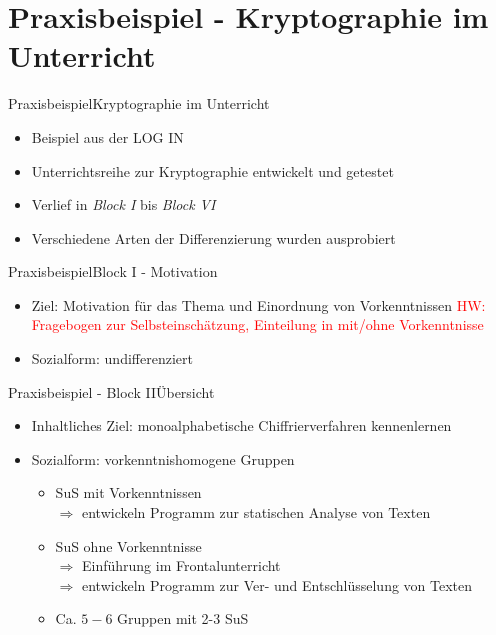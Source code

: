 \documentclass{beamer}
\newcommand{\teacher}[1]{\textcolor{red}{#1}}
\newcommand{\ppause}{}
\begin{document}
	\section{Praxisbeispiel - Kryptographie im Unterricht}
	
	\begin{frame}[t]{Praxisbeispiel}{Kryptographie im Unterricht}
		\begin{itemize}
			\ppause
			\item Beispiel aus der LOG IN
			\ppause
			\item Unterrichtsreihe zur Kryptographie entwickelt und getestet
			\ppause
			\item Verlief in \textit{Block I} bis \textit{Block VI}
			\ppause
			\item Verschiedene Arten der Differenzierung wurden ausprobiert
		\end{itemize}
	\end{frame}
	
	\begin{frame}[t]{Praxisbeispiel}{Block I - Motivation}
		\begin{itemize}
			\ppause
			\item Ziel: Motivation für das Thema und Einordnung von Vorkenntnissen
			\teacher{HW: Fragebogen zur Selbsteinschätzung, Einteilung in mit/ohne Vorkenntnisse}
			\ppause
			\item Sozialform: undifferenziert
		\end{itemize}
	\end{frame}
	
	\begin{frame}[t]{Praxisbeispiel - Block II}{Übersicht}
		\begin{itemize}
			\item Inhaltliches Ziel: monoalphabetische Chiffrierverfahren kennenlernen\\
			\ppause
			\item Sozialform: vorkenntnishomogene Gruppen
			\ppause
			\begin{itemize}
				\item SuS mit Vorkenntnissen\\
				$\Rightarrow$ entwickeln Programm zur statischen Analyse von Texten
				\ppause
				\item SuS ohne Vorkenntnisse\\
				$\Rightarrow$ Einführung im Frontalunterricht\\
				$\Rightarrow$ entwickeln Programm zur Ver- und Entschlüsselung von Texten
				\ppause
				\item Ca. $5-6$ Gruppen mit 2-3 SuS
			\end{itemize}
		\end{itemize}
	\end{frame}
	
\end{document}
